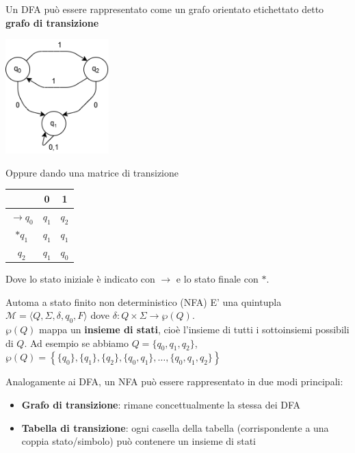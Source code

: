 \documentclass[12pt, a4paper]{report}
\begin{document}
                \newpage
                Un DFA può essere rappresentato come un grafo orientato etichettato detto \textbf{grafo di transizione}
                \begin{center}
                    \includegraphics[width=0.3\textwidth]{Images/dfagraph.png}
                \end{center}
                Oppure dando una matrice di transizione
                \begin{center}
                    \begin{tabular}{|c|c|c|}
                        \hline
                         & 0 & 1 \\
                        \hline
                        $\displaystyle \to q_0$ & $q_1$ & $q_2$\\
                        \hline
                        $*q_1$& $q_1$ & $q_1$ \\
                        \hline
                        $q_2$ & $q_1$ & $q_0$ \\
                        \hline
                    \end{tabular}
                \end{center}
                Dove lo stato iniziale è indicato con $\to$ e lo stato finale con $*$.
                \begin{definitionbox}{Automa a stato finito non deterministico (NFA)}{}
                    E' una quintupla $\mathcal{M}=\langle Q,\Sigma, \delta, q_0, F\rangle$ dove $\delta:Q\times\Sigma\to\wp(Q)$.\\
                    $\wp(Q)$ mappa un \textbf{insieme di stati}, cioè l'insieme di tutti i sottoinsiemi possibili di $Q$. Ad esempio se abbiamo $Q=\{q_0,q_1,q_2\}$, $\wp(Q)=\left\{\{q_0\},\{q_1\},\{q_2\},\{q_0,q_1\},\ldots,\{q_0,q_1,q_2\}\right\}$
                \end{definitionbox}
                Analogamente ai DFA, un NFA può essere rappresentato in due modi principali:
                \begin{itemize}
                    \item \textbf{Grafo di transizione}: rimane concettualmente la stessa dei DFA
                    \item \textbf{Tabella di transizione}: ogni casella della tabella (corrispondente a una coppia stato/simbolo) può contenere un insieme di stati
                \end{itemize}
\end{document}

